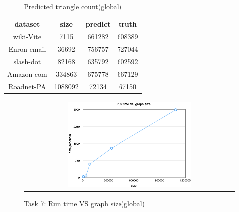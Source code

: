\begin{table}
\begin{center}
\begin{tabular} {| c | c | c | c | }
    \hline
    dataset & size & predict & truth \\ \hline
    wiki-Vite & 7115 & 661282 & 608389 \\ \hline
    Enron-email & 36692 & 756757 & 727044 \\ \hline
    slash-dot & 82168 & 635792 & 602592 \\ \hline
    Amazon-com & 334863 & 675778 & 667129 \\ \hline
    Roadnet-PA & 1088092 & 72134 & 67150 \\ \hline
\end{tabular}
\end{center}
\caption{Predicted triangle count(global)}
\label{t7:globalpredict}
\end{table}


\begin{figure}[!htbf]
\begin{center}
\begin{tabular}{c}
     \includegraphics[width=0.6\textwidth]{FIG/t7_time.png}
\end{tabular}
\caption{Task 7: Run time VS graph size(global)}
\label{t7:globaltime}
\end{center}
\end{figure}

